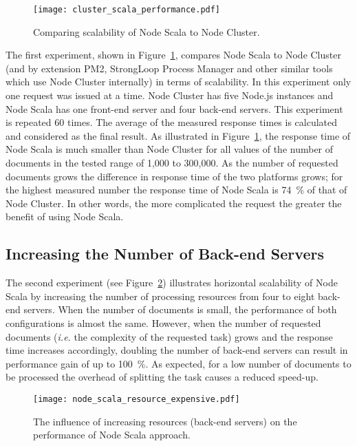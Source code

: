 \documentclass[10pt,conference,letterpaper]{IEEEtran}
\begin{document}
\begin{figure}
  \centering
    \texttt{[image: cluster\_scala\_performance.pdf]}
  \caption{Comparing scalability of Node Scala to Node Cluster.}
  \label{fig:cluster_scala_performance}
\end{figure}

The first experiment, shown in
Figure~\ref{fig:cluster_scala_performance}, compares Node Scala to
Node Cluster (and by extension PM2, StrongLoop Process Manager and
other similar tools which use Node Cluster internally) in terms of
scalability. In this experiment only one request was issued at a
time. Node Cluster has five Node.js instances and Node Scala has one
front-end server and four back-end servers. This experiment is
repeated 60 times. The average of the measured response times is
calculated and considered as the final result. As illustrated in
Figure~\ref{fig:cluster_scala_performance}, the response time of Node
Scala is much smaller than Node Cluster for all values of the number
of documents in the tested range of 1,000 to 300,000. As the number of
requested documents grows the difference in response time of the two
platforms grows; for the highest measured number the response time of
Node Scala is 74~\% of that of Node Cluster. In other words, the more
complicated the request the greater the benefit of using Node Scala.

\subsection{Increasing the Number of Back-end Servers}

The second experiment (see
Figure~\ref{fig:node_scala_resource_expensive}) illustrates horizontal
scalability of Node Scala by increasing the number of processing
resources from four to eight back-end servers. When the number of
documents is small, the performance of both configurations is almost
the same. However, when the number of requested documents
(\textit{i.e.} the complexity of the requested task) grows and the
response time increases accordingly, doubling the number of back-end
servers can result in performance gain of up to 100~\%. As expected,
for a low number of documents to be processed the overhead of
splitting the task causes a reduced speed-up.

\begin{figure}
  \centering
    \texttt{[image: node\_scala\_resource\_expensive.pdf]}
  \caption{The influence of increasing resources (back-end servers) on the performance of Node Scala approach.}
  \label{fig:node_scala_resource_expensive}
\end{figure}
\end{document}
